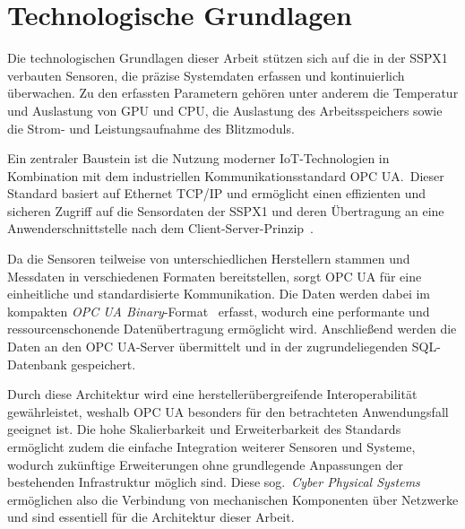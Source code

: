 \section{Technologische Grundlagen}\label{sec:technologische_grundlagen}
Die technologischen Grundlagen dieser Arbeit stützen sich auf die in der SSPX1 verbauten Sensoren, die präzise Systemdaten erfassen
und kontinuierlich überwachen. Zu den erfassten Parametern gehören unter anderem die Temperatur und Auslastung von GPU und CPU,
die Auslastung des Arbeitsspeichers sowie die Strom- und Leistungsaufnahme des Blitzmoduls.

Ein zentraler Baustein ist die Nutzung moderner IoT-Technologien in Kombination mit dem industriellen Kommunikationsstandard OPC UA.\
Dieser Standard basiert auf Ethernet TCP/IP und ermöglicht einen effizienten und sicheren Zugriff auf die Sensordaten der SSPX1 und
deren Übertragung an eine Anwenderschnittstelle nach dem Client-Server-Prinzip~\cite[S.~470]{Babel2024}.

Da die Sensoren teilweise von unterschiedlichen Herstellern stammen und Messdaten in verschiedenen Formaten bereitstellen, sorgt OPC
UA für eine einheitliche und standardisierte Kommunikation. Die Daten werden dabei im kompakten \textit{OPC UA Binary}-Format~\cite{iec62541}
erfasst, wodurch eine performante und ressourcenschonende Datenübertragung ermöglicht wird. Anschließend werden die Daten an den OPC
UA-Server übermittelt und in der zugrundeliegenden SQL-Datenbank gespeichert. 

Durch diese Architektur wird eine herstellerübergreifende Interoperabilität gewährleistet, weshalb OPC UA besonders für den betrachteten
Anwendungsfall geeignet ist. Die hohe Skalierbarkeit und Erweiterbarkeit des Standards ermöglicht zudem die einfache Integration
weiterer Sensoren und Systeme, wodurch zukünftige Erweiterungen ohne grundlegende Anpassungen der bestehenden Infrastruktur möglich
sind. Diese sog.~\textit{Cyber Physical Systems} ermöglichen also die Verbindung von mechanischen Komponenten über Netzwerke und sind
essentiell für die Architektur dieser Arbeit.

